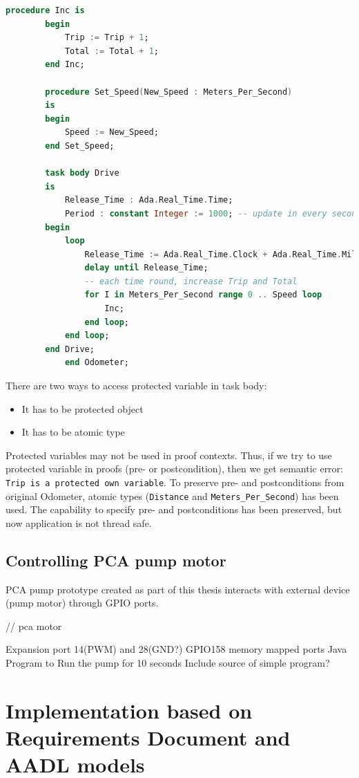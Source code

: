 \begin{lstlisting}[language=ada, frame=single, gobble=0, caption={Multitasking Odometer}]
	    procedure Inc is
	    begin
	        Trip := Trip + 1;
	        Total := Total + 1;
	    end Inc;
	    
	    procedure Set_Speed(New_Speed : Meters_Per_Second)
	    is
	    begin
	        Speed := New_Speed;
	    end Set_Speed;    
	    
	    task body Drive
	    is
	        Release_Time : Ada.Real_Time.Time;
	        Period : constant Integer := 1000; -- update in every second
	    begin
	        loop
	            Release_Time := Ada.Real_Time.Clock + Ada.Real_Time.Milliseconds(Period);
	            delay until Release_Time;
	            -- each time round, increase Trip and Total
	            for I in Meters_Per_Second range 0 .. Speed loop
	                Inc;
	            end loop;            
	        end loop;
	    end Drive;
	    	end Odometer;
\end{lstlisting} 
\label{listing:Odometer2005Tasking}

There are two ways to access protected variable in task body:
\begin{itemize}
    \item It has to be protected object
    \item It has to be atomic type
\end{itemize}

Protected variables may not be used in proof contexts. Thus, if we try to use protected variable in proofs (pre- or postcondition), then we get semantic error: \lstinline{Trip is a protected own variable}. To preserve pre- and postconditions from original Odometer, atomic types (\lstinline{Distance} and \lstinline{Meters_Per_Second}) has been used. The capability to specify pre- and postconditions has been preserved, but now application is not thread safe.


\subsection{Controlling PCA pump motor}
\label{pcapumpimpl:beagleboard:pcapumpmotor}

PCA pump prototype created as part of this thesis interacts with external device (pump motor) through GPIO ports. 

// pca motor


Expansion port 14(PWM) and 28(GND?)
GPIO158
memory mapped ports
Java Program to Run the pump for 10 seconds
Include source of simple program?


\section{Implementation based on Requirements Document and AADL models}
\label{pcapumpimpl:manual}

